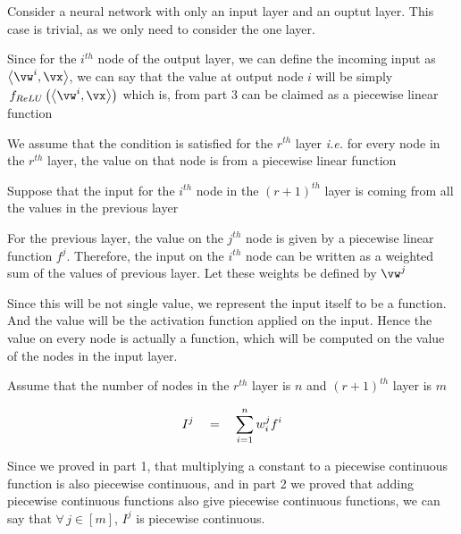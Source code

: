 \documentclass{article}
\begin{document}
\begin{mlsolution}
\begin{addmargin}{1.5em}
		\begin{base}

			Consider a neural network with only an input layer and an ouptut layer. This case is trivial, as we only need to consider the one layer. \br%

			Since for the $i^{th}$ node of the output layer, we can define the incoming input as $\ip{\vw^i}{\vx}$, we can say that the value at output node $i$ will be simply $\func{f_{ReLU}}{\ip{\vw^i}{\vx}}$ which is, from part 3 can be claimed as a piecewise linear function

		\end{base}
		\clearpage
		\begin{hypoth}

			We assume that the condition is satisfied for the $r^{th}$ layer \textit{i.e.} for every node in the $r^{th}$ layer, the value on that node is from a piecewise linear function \br%

		\end{hypoth}

		\begin{indctn}

			Suppose that the input for the $i^{th}$ node in the $(r + 1)^{th}$ layer is coming from all the values in the previous layer \br%

			For the previous layer, the value on the $j^{th}$ node is given by a piecewise linear function $f^j$. Therefore, the input on the $i^{th}$ node can be written as a weighted sum of the values of previous layer. Let these weights be defined by $\vw^j$

			Since this will be not single value, we represent the input itself to be a function. And the value will be the activation function applied on the input. Hence the value on every node is actually a function, which will be computed on the value of the nodes in the input layer.

			Assume that the number of nodes in the $r^{th}$ layer is $n$ and $(r + 1)^{th}$ layer is $m$

		\end{indctn}

		\begin{align*}
			I^j	\quad = \quad	\sum_{i = 1}^{n} w^j_i f^i
		\end{align*}

		Since we proved in part 1, that multiplying a constant to a piecewise continuous function is also piecewise continuous, and in part 2 we proved that adding piecewise continuous functions also give piecewise continuous functions, we can say that $\forall\, j \in [m]$, $I^j$ is piecewise continuous. \br%


\end{addmargin}
\end{mlsolution}
\end{document}
